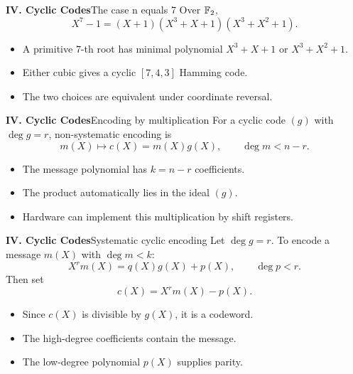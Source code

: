 \begin{frame}{\textbf{IV. Cyclic Codes}}{The case n equals 7}
\small
Over $\mathbb{F}_2$,
\[
  X^7-1=(X+1)(X^3+X+1)(X^3+X^2+1).
\]
\begin{itemize}
  \item A primitive $7$-th root has minimal polynomial $X^3+X+1$ or $X^3+X^2+1$.
  \item Either cubic gives a cyclic $[7,4,3]$ Hamming code.
  \item The two choices are equivalent under coordinate reversal.
\end{itemize}
\end{frame}

\begin{frame}{\textbf{IV. Cyclic Codes}}{Encoding by multiplication}
\small
For a cyclic code $(g)$ with $\deg g=r$, non-systematic encoding is
\[
  m(X)\longmapsto c(X)=m(X)g(X),\qquad \deg m< n-r.
\]
\begin{itemize}
  \item The message polynomial has $k=n-r$ coefficients.
  \item The product automatically lies in the ideal $(g)$.
  \item Hardware can implement this multiplication by shift registers.
\end{itemize}
\end{frame}

\begin{frame}{\textbf{IV. Cyclic Codes}}{Systematic cyclic encoding}
\small
Let $\deg g=r$. To encode a message $m(X)$ with $\deg m<k$:
\[
  X^r m(X)=q(X)g(X)+p(X),\qquad \deg p<r.
\]
Then set
\[
  c(X)=X^rm(X)-p(X).
\]
\begin{itemize}
  \item Since $c(X)$ is divisible by $g(X)$, it is a codeword.
  \item The high-degree coefficients contain the message.
  \item The low-degree polynomial $p(X)$ supplies parity.
\end{itemize}
\end{frame}

